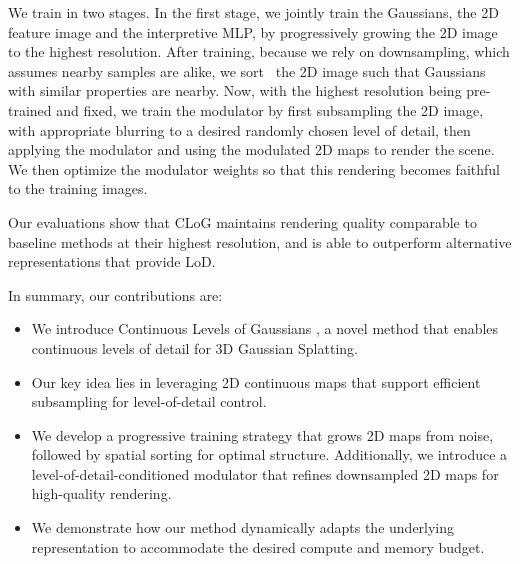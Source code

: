   We train \clog in two stages.
  In the first stage, we jointly train the Gaussians, the 2D feature image and
  the interpretive MLP, by progressively growing the 2D image to the highest
  resolution.
  After training, because we rely on downsampling, which assumes nearby samples
  are alike, we sort~\cite{morgenstern2024compact} the 2D image such that
  Gaussians with similar properties are nearby.
  Now, with the highest resolution being pre-trained and fixed, we train the
  modulator by first subsampling the 2D image, with appropriate blurring to a
  desired randomly chosen level of detail, then applying the modulator and using
  the modulated 2D maps to render the scene.
  We then optimize the modulator weights so that this rendering becomes faithful
  to the training images.

  Our evaluations show that CLoG maintains rendering quality comparable to
  baseline methods at their highest resolution, and is able to outperform
  alternative representations that provide LoD.

  \noindent
  In summary, our contributions are:
  \begin{itemize}
    \item We introduce Continuous Levels of Gaussians \clog, a novel method that enables continuous levels of detail for 3D Gaussian Splatting.
    \item Our key idea lies in leveraging 2D continuous maps that support efficient subsampling for level-of-detail control.
    \item We develop a progressive training strategy that grows 2D maps from noise, followed by spatial sorting for optimal structure.
          Additionally, we introduce a level-of-detail-conditioned modulator that
          refines downsampled 2D maps for high-quality rendering.
    \item We demonstrate how our method dynamically adapts the underlying representation to accommodate the desired compute and memory budget.
  \end{itemize}

